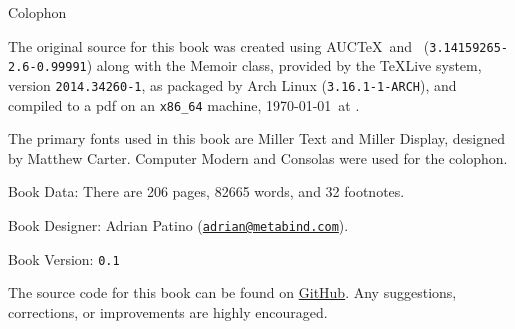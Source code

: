 
\cleartoverso
\pagestyle{empty}

\newlength{\colophon}
\calccentering{\colophon}
\begin{adjustwidth*}{\colophon}{\colophon}

\begin{flushleft}
\setlength{\parskip}{1.5\baselineskip}
{\large Colophon}

The original source for this book was created using AUC\TeX\ and
\XeLaTeX\ (\texttt{3.14159265-2.6-0.99991}) along with the Memoir
class, provided by the \TeX Live system, version
\texttt{2014.34260-1}, as packaged by Arch Linux
(\texttt{3.16.1-1-ARCH}), and compiled to a pdf on an
\texttt{x86\_64} machine, \today\ at \printtime*.

The primary fonts used in this book are Miller Text and Miller
Display, designed by Matthew Carter.  Computer Modern and Consolas
were used for the colophon.

Book Data: There are 206 pages, 82665 words, and 32 footnotes. 

Book Designer: Adrian Patino
(\href{mailto:adrian@metabind.com}{\texttt{adrian@metabind.com}}).

Book Version: \texttt{0.1}

The source code for this book can be found on
\href{https://github.com/metabind/spirit-hazlitt}{GitHub}.  Any
suggestions, corrections, or improvements are highly encouraged.


\end{flushleft}
\end{adjustwidth*}
